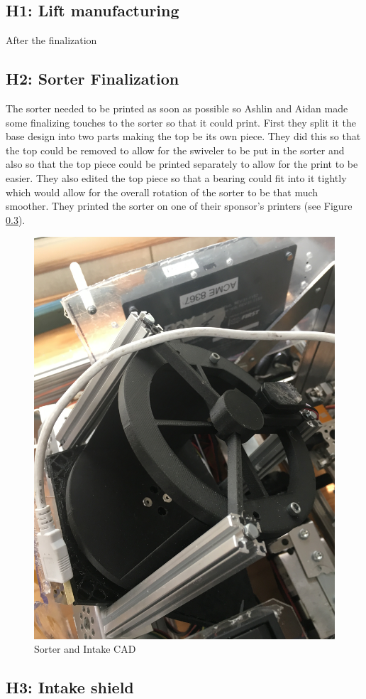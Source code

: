 \documentclass{article}
\begin{document}
\subsection{H1: Lift manufacturing}

 After the finalization
 
\subsection{H2: Sorter Finalization}

The sorter needed to be printed as soon as possible so Ashlin and Aidan made some finalizing touches to the sorter so that it could print. First they split it the base design into two parts making the top be its own piece. They did this so that the top could be removed to allow for the swiveler to be put in the sorter and also so that the top piece could be printed separately to allow for the print to be easier. They also edited the top piece so that a bearing could fit into it tightly which would allow for the overall rotation of the sorter to be that much smoother. They printed the sorter on one of their sponsor's printers (see Figure \ref{}).

\begin{figure}
    \centering
    \includegraphics[width=.6 \textwidth, angle=270]{10_11-05/images/sorter.JPG}
    \caption{Sorter and Intake CAD}
    \label{fig:Intake CAD}
\end{figure}

\subsection{H3: Intake shield}
\end{document}
